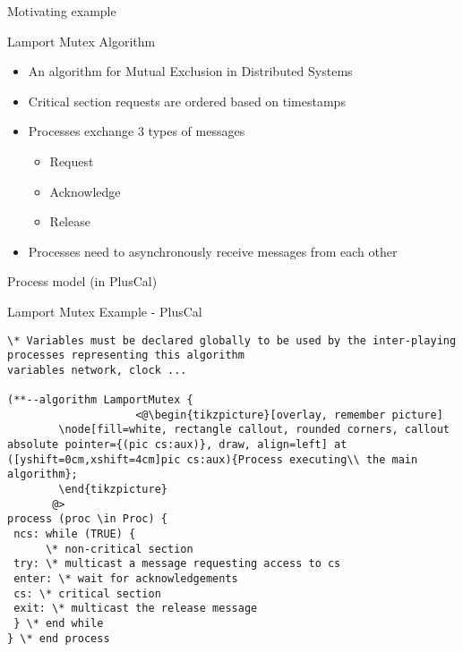 \documentclass{beamer}
\begin{document}
\begin{frame}[fragile]{Motivating example}

\begin{block}{Lamport Mutex Algorithm}
\begin{itemize}
  \item An algorithm for Mutual Exclusion in Distributed Systems
  \item Critical section requests are ordered based on timestamps
  \item Processes exchange 3 types of messages
  \begin{itemize} 
        \item Request
        \item Acknowledge
        \item Release
    \end{itemize}
   \item Processes need to asynchronously receive messages from each other
\end{itemize}
\end{block}
\end{frame}

\begin{frame}[fragile]{Process model (in PlusCal)}
\begin{exampleblock}{Lamport Mutex Example - PlusCal}
\begin{lstlisting}[language=pluscal, frame = none, numbers = none]
\* Variables must be declared globally to be used by the inter-playing processes representing this algorithm
variables network, clock ...

(**--algorithm LamportMutex {
                    <@\begin{tikzpicture}[overlay, remember picture]
        \node[fill=white, rectangle callout, rounded corners, callout absolute pointer={(pic cs:aux)}, draw, align=left] at ([yshift=0cm,xshift=4cm]pic cs:aux){Process executing\\ the main algorithm};
        \end{tikzpicture}
       @>
process (proc \in Proc) {
 ncs: while (TRUE) {
      \* non-critical section
 try: \* multicast a message requesting access to cs
 enter: \* wait for acknowledgements 
 cs: \* critical section
 exit: \* multicast the release message
 } \* end while
} \* end process
\end{lstlisting}
\end{exampleblock}
\end{frame}
\end{document}
